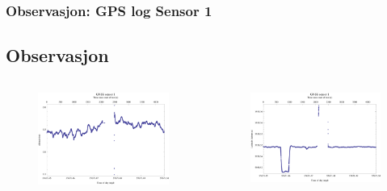 \documentclass[xcolor=table]{beamer}
\begin{document}
\begin{frame}
\frametitle{Observasjon: GPS log Sensor 1}
  \subsection{Observasjon}
    \vspace{-40pt}
    \begin{columns}
      \begin{figure}
        \includegraphics[scale=0.40]{thesis/graphics/gnssAlt1-1.png}
      \end{figure}
      \vspace{-30pt}
      \begin{figure}
        \includegraphics[scale=0.40]{thesis/graphics/gnssLat1-1.png}
      \end{figure}

\end{columns}
\end{frame}
\end{document}
